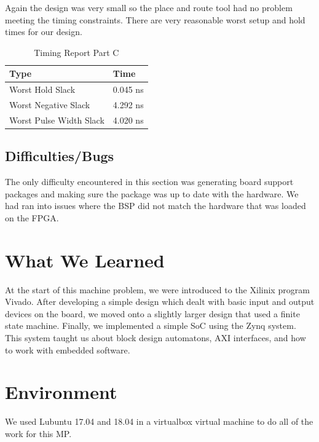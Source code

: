 \documentclass[letterpaper, 10 pt, conference]{IEEEconf}  %
\begin{document}
Again the design was very small so the place and route tool had no problem meeting the timing constraints. There are very reasonable worst setup and hold times for our design.

\begin{table}[H]
\centering
\caption{Timing Report Part C}
\label{table_example}
\begin{tabular}{|l|l|}
\hline
\rowcolor[HTML]{EFEFEF} 
Type                 & Time     \\ \hline
Worst Hold Slack     & 0.045 ns \\ \hline
Worst Negative Slack & 4.292 ns \\ \hline
Worst Pulse Width Slack & 4.020 ns \\ \hline
\end{tabular}
\end{table}

\subsection{Difficulties/Bugs}
The only difficulty encountered in this section was generating board support packages and making sure the package was up to date with the hardware. We had ran into issues where the BSP did not match the hardware that was loaded on the FPGA. 

\section{What We Learned}
At the start of this machine problem, we were introduced to the Xilinix program Vivado. After developing a simple design which dealt with basic input and output devices on the board, we moved onto a slightly larger design that used a finite state machine. Finally, we implemented a simple SoC using the Zynq system. This system taught us about block design automatons, AXI interfaces, and how to work with embedded software. 

\section{Environment}
We used Lubuntu 17.04 and 18.04 in a virtualbox virtual machine to do all of the work for this MP.
\end{document}
